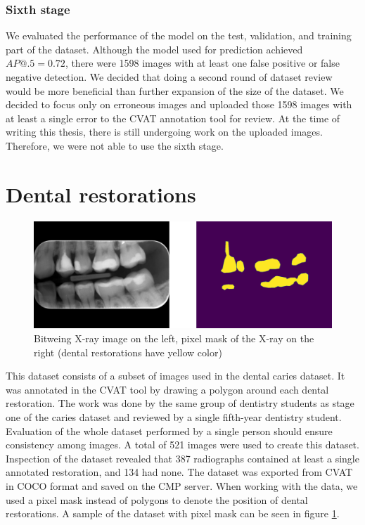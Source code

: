 \subsubsection{Sixth stage}
We evaluated the performance of the model on the test, validation, and training part of the dataset. Although the model used for prediction achieved $AP@.5 = 0.72$, there were 1598 images with at least one false positive or false negative detection. We decided that doing a second round of dataset review would be more beneficial than further expansion of the size of the dataset. We decided to focus only on erroneous images and uploaded those 1598 images with at least a single error to the CVAT annotation tool for review. At the time of writing this thesis, there is still undergoing work on the uploaded images. Therefore, we were not able to use the sixth stage.


\section{Dental restorations}
\begin{figure}
    \centering
    \includegraphics[width=\linewidth]{images/segmentation_ds_sample.pdf}
    \caption{Bitweing X-ray image on the left, pixel mask of the X-ray on the right (dental restorations have yellow color)}
    \label{fig:segmentation_sample}
\end{figure}
This dataset consists of a subset of images used in the dental caries dataset. It was annotated in the CVAT tool by drawing a polygon around each dental restoration. The work was done by the same group of dentistry students as stage one of the caries dataset and reviewed by a single fifth-year dentistry student. Evaluation of the whole dataset performed by a single person should ensure consistency among images. A total of 521 images were used to create this dataset. Inspection of the dataset revealed that 387 radiographs contained at least a single annotated restoration, and 134 had none.
The dataset was exported from CVAT in COCO format and saved on the CMP server. When working with the data, we used a pixel mask instead of polygons to denote the position of dental restorations. A sample of the dataset with pixel mask can be seen in figure \ref{fig:segmentation_sample}.

